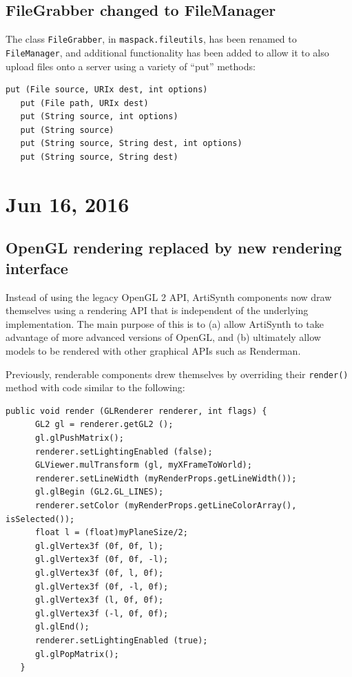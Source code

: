 \documentclass{article}
\begin{document}
\subsection*{FileGrabber changed to FileManager}

The class {\tt FileGrabber}, in {\tt maspack.fileutils}, has been
renamed to {\tt FileManager}, and additional functionality has been
added to allow it to also upload files onto a server using
a variety of ``put'' methods:
%
\begin{lstlisting}[]
   put (File source, URIx dest, int options)
   put (File path, URIx dest) 
   put (String source, int options)
   put (String source)
   put (String source, String dest, int options)
   put (String source, String dest)
\end{lstlisting}
%

\section*{Jun 16, 2016}

\subsection*{OpenGL rendering replaced by new rendering interface}

Instead of using the legacy OpenGL 2 API, ArtiSynth components now
draw themselves using a rendering API that is independent of the
underlying implementation. The main purpose of this is to (a) allow
ArtiSynth to take advantage of more advanced versions of OpenGL, and
(b) ultimately allow models to be rendered with other graphical APIs
such as Renderman.

Previously, renderable components drew themselves by overriding their
{\tt render()} method with code similar to the following:
%
\begin{lstlisting}[]
   public void render (GLRenderer renderer, int flags) {
      GL2 gl = renderer.getGL2 ();
      gl.glPushMatrix();
      renderer.setLightingEnabled (false);
      GLViewer.mulTransform (gl, myXFrameToWorld);
      renderer.setLineWidth (myRenderProps.getLineWidth());
      gl.glBegin (GL2.GL_LINES);
      renderer.setColor (myRenderProps.getLineColorArray(), isSelected());
      float l = (float)myPlaneSize/2;
      gl.glVertex3f (0f, 0f, l);
      gl.glVertex3f (0f, 0f, -l);
      gl.glVertex3f (0f, l, 0f);
      gl.glVertex3f (0f, -l, 0f);
      gl.glVertex3f (l, 0f, 0f);
      gl.glVertex3f (-l, 0f, 0f);
      gl.glEnd();
      renderer.setLightingEnabled (true);
      gl.glPopMatrix();
   }
\end{lstlisting}
%
\end{document}
